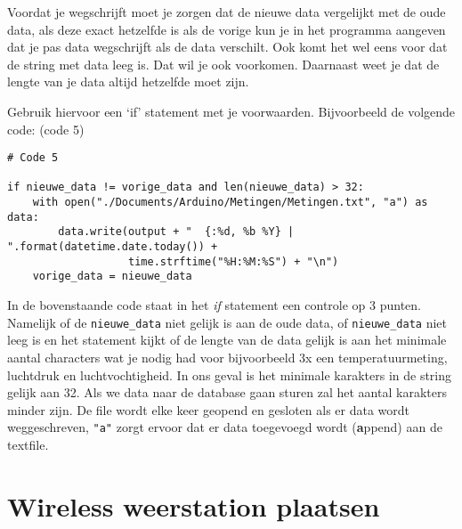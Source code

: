 Voordat je wegschrijft moet je zorgen dat de nieuwe data vergelijkt met
de oude data, als deze exact hetzelfde is als de vorige kun je in het
programma aangeven dat je pas data wegschrijft als de data verschilt.
Ook komt het wel eens voor dat de string met data leeg is. Dat wil je
ook voorkomen. Daarnaast weet je dat de lengte van je data altijd
hetzelfde moet zijn.

Gebruik hiervoor een `if' statement met je voorwaarden. Bijvoorbeeld de volgende code:
(code 5)

\begin{verbatim}
# Code 5

if nieuwe_data != vorige_data and len(nieuwe_data) > 32:
    with open("./Documents/Arduino/Metingen/Metingen.txt", "a") as data:
        data.write(output + "  {:%d, %b %Y} | ".format(datetime.date.today()) +
                   time.strftime("%H:%M:%S") + "\n")
    vorige_data = nieuwe_data
\end{verbatim}

In de bovenstaande code staat in het \textit{if} statement een controle op 3
punten. Namelijk of de \verb|nieuwe_data| niet gelijk is aan de oude data, of
\verb|nieuwe_data| niet leeg is en het statement kijkt of de lengte van de data
gelijk is aan het minimale aantal characters wat je nodig had voor
bijvoorbeeld 3x een temperatuurmeting, luchtdruk en luchtvochtigheid. In ons geval is
het minimale karakters in de string gelijk aan 32. Als we data naar de \hisparc database gaan
sturen zal het aantal karakters minder zijn.
De file wordt elke keer geopend en gesloten als er data wordt weggeschreven, \verb|"a"|
zorgt ervoor dat er data toegevoegd wordt (\textbf{a}ppend) aan de textfile.

\section{Wireless weerstation plaatsen}

